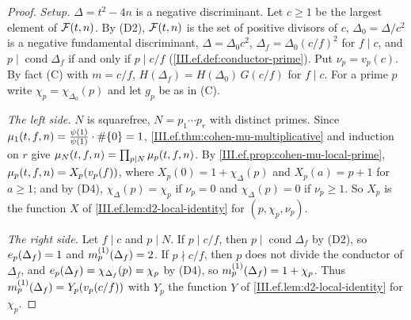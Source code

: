 \begin{theorem}
\end{theorem}
\begin{proof}
\emph{Setup.} $\Delta=t^2-4n$ is a negative discriminant. Let $c\ge1$ be the largest element of $\mathcal{F}(t,n)$. By (D2), $\mathcal{F}(t,n)$ is the set of
positive divisors of $c$, $\Delta_0=\Delta/c^2$ is a negative fundamental discriminant, $\Delta=\Delta_0c^2$, $\Delta_f=\Delta_0(c/f)^2$ for $f\mid c$,
and $p\mid\operatorname{cond}\Delta_f$ if and only if $p\mid c/f$ (\cref{III.ef.def:conductor-prime}). Put $\nu_p=v_p(c)$. By fact (C) with
$m=c/f$, $H(\Delta_f)=H(\Delta_0)\,G(c/f)$ for $f\mid c$. For a prime $p$ write $\chi_p=\chi_{\Delta_0}(p)$ and let $g_p$ be as in (C).

\emph{The left side.} $N$ is squarefree, $N=p_1\cdots p_r$ with distinct primes. Since $\mu_1(t,f,n)=\frac{\psi(1)}{\psi(1)}\cdot\#\{0\}=1$,
\cref{III.ef.thm:cohen-mu-multiplicative} and induction on $r$ give $\mu_N(t,f,n)=\prod_{p\mid N}\mu_p(t,f,n)$. By
\cref{III.ef.prop:cohen-mu-local-prime}, $\mu_p(t,f,n)=X_p(v_p(f))$, where $X_p(0)=1+\chi_\Delta(p)$ and $X_p(a)=p+1$ for $a\ge1$; and by (D4),
$\chi_\Delta(p)=\chi_p$ if $\nu_p=0$ and $\chi_\Delta(p)=0$ if $\nu_p\ge1$. So $X_p$ is the function $X$ of \cref{III.ef.lem:d2-local-identity} for
$(p,\chi_p,\nu_p)$.

\emph{The right side.} Let $f\mid c$ and $p\mid N$. If $p\mid c/f$, then $p\mid\operatorname{cond}\Delta_f$ by (D2), so $e_p(\Delta_f)=1$ and
$m^{(1)}_p(\Delta_f)=2$. If $p\nmid c/f$, then $p$ does not divide the conductor of $\Delta_f$, and $e_p(\Delta_f)=\chi_{\Delta_f}(p)=\chi_p$ by (D4),
so $m^{(1)}_p(\Delta_f)=1+\chi_p$. Thus $m^{(1)}_p(\Delta_f)=Y_p(v_p(c/f))$ with $Y_p$ the function $Y$ of \cref{III.ef.lem:d2-local-identity} for $\chi_p$.


\end{proof}
